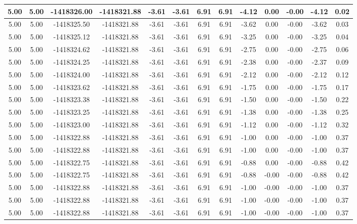 \begin{table}[htbp]
\begin{adjustbox}{angle=90}
\begin{tabular}{|c|c|c|c|c|c|c|c|c|c|c|c|c|}
 5.00 & 5.00 & -1418326.00 & -1418321.88 & -3.61 & -3.61 & 6.91 & 6.91 & -4.12 & 0.00 & -0.00 & -4.12 & 0.02\\ \hline
 5.00 & 5.00 & -1418325.50 & -1418321.88 & -3.61 & -3.61 & 6.91 & 6.91 & -3.62 & 0.00 & -0.00 & -3.62 & 0.03\\ \hline
 5.00 & 5.00 & -1418325.12 & -1418321.88 & -3.61 & -3.61 & 6.91 & 6.91 & -3.25 & 0.00 & -0.00 & -3.25 & 0.04\\ \hline
 5.00 & 5.00 & -1418324.62 & -1418321.88 & -3.61 & -3.61 & 6.91 & 6.91 & -2.75 & 0.00 & -0.00 & -2.75 & 0.06\\ \hline
 5.00 & 5.00 & -1418324.25 & -1418321.88 & -3.61 & -3.61 & 6.91 & 6.91 & -2.38 & 0.00 & -0.00 & -2.37 & 0.09\\ \hline
 5.00 & 5.00 & -1418324.00 & -1418321.88 & -3.61 & -3.61 & 6.91 & 6.91 & -2.12 & 0.00 & -0.00 & -2.12 & 0.12\\ \hline
 5.00 & 5.00 & -1418323.62 & -1418321.88 & -3.61 & -3.61 & 6.91 & 6.91 & -1.75 & 0.00 & -0.00 & -1.75 & 0.17\\ \hline
 5.00 & 5.00 & -1418323.38 & -1418321.88 & -3.61 & -3.61 & 6.91 & 6.91 & -1.50 & 0.00 & -0.00 & -1.50 & 0.22\\ \hline
 5.00 & 5.00 & -1418323.25 & -1418321.88 & -3.61 & -3.61 & 6.91 & 6.91 & -1.38 & 0.00 & -0.00 & -1.38 & 0.25\\ \hline
 5.00 & 5.00 & -1418323.00 & -1418321.88 & -3.61 & -3.61 & 6.91 & 6.91 & -1.12 & 0.00 & -0.00 & -1.12 & 0.32\\ \hline
 5.00 & 5.00 & -1418322.88 & -1418321.88 & -3.61 & -3.61 & 6.91 & 6.91 & -1.00 & 0.00 & -0.00 & -1.00 & 0.37\\ \hline
 5.00 & 5.00 & -1418322.88 & -1418321.88 & -3.61 & -3.61 & 6.91 & 6.91 & -1.00 & 0.00 & -0.00 & -1.00 & 0.37\\ \hline
 5.00 & 5.00 & -1418322.75 & -1418321.88 & -3.61 & -3.61 & 6.91 & 6.91 & -0.88 & 0.00 & -0.00 & -0.88 & 0.42\\ \hline
 5.00 & 5.00 & -1418322.75 & -1418321.88 & -3.61 & -3.61 & 6.91 & 6.91 & -0.88 & -0.00 & -0.00 & -0.88 & 0.42\\ \hline
 5.00 & 5.00 & -1418322.88 & -1418321.88 & -3.61 & -3.61 & 6.91 & 6.91 & -1.00 & -0.00 & -0.00 & -1.00 & 0.37\\ \hline
 5.00 & 5.00 & -1418322.88 & -1418321.88 & -3.61 & -3.61 & 6.91 & 6.91 & -1.00 & -0.00 & -0.00 & -1.00 & 0.37\\ \hline
 5.00 & 5.00 & -1418322.88 & -1418321.88 & -3.61 & -3.61 & 6.91 & 6.91 & -1.00 & -0.00 & -0.00 & -1.00 & 0.37\\ \hline

\end{tabular}
\end{adjustbox}
\end{table}
